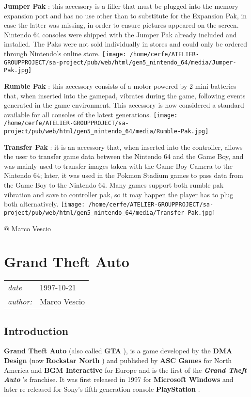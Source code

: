 \documentclass[a4paper,10pt]{book}
\newcommand{\pageHeader}[4]{
    \section{#1}
    \vspace{-0.3cm}
    \begin{table}[h!]
     \begin{tabular}{ll}
        \hline
        \textit{date} & #2 \\
        \textit{author: } & #3\\
        \hline
     \end{tabular}
    \end{table}
    \vspace{-0.3cm}
}
\begin{document}
 \textbf{Jumper Pak } : this accessory is a filler that must be plugged into the memory expansion port and has no use other than to substitute for the Expansion Pak, in case the latter was missing, in order to ensure pictures appeared on the screen. Nintendo 64 consoles were shipped with the Jumper Pak already included and installed. The Paks were not sold individually in stores and could only be ordered through Nintendo's online store. 
 \texttt{[image: /home/cerfe/ATELIER-GROUPPROJECT/sa-project/pub/web/html/gen5\_nintendo\_64/media/Jumper-Pak.jpg]}
 
 \textbf{Rumble Pak } : this accessory consists of a motor powered by 2 mini batteries that, when inserted into the gamepad, vibrates during the game, following events generated in the game environment. This accessory is now considered a standard available for all consoles of the latest generations. 
 \texttt{[image: /home/cerfe/ATELIER-GROUPPROJECT/sa-project/pub/web/html/gen5\_nintendo\_64/media/Rumble-Pak.jpg]}
 
 \textbf{Transfer Pak } : it is an accessory that, when inserted into the controller, allows the user to transfer game data between the Nintendo 64 and the Game Boy, and was mainly used to transfer images taken with the Game Boy Camera to the Nintendo 64; later, it was used in the Pokmon Stadium games to pass data from the Game Boy to the Nintendo 64. 
                Many games support both rumble pak vibration and save to controller pak, so it may happen the player has to plug both alternatively. 
 \texttt{[image: /home/cerfe/ATELIER-GROUPPROJECT/sa-project/pub/web/html/gen5\_nintendo\_64/media/Transfer-Pak.jpg]}
 
 
 
 
 @ Marco Vescio 
 
 \newpage\pageHeader{Grand Theft Auto}{1997-10-21}{Marco Vescio}{A webpage about GTA}
 \subsection{Introduction }
 
 \textbf{Grand Theft Auto }  (also called  \textbf{GTA } ), is a game developed by the  \textbf{DMA Design }  (now  \textbf{Rockstar North } ) and published by  \textbf{ASC Games }  for North America and  \textbf{BGM Interactive }  for Europe
        and is the first of the  \textbf{\textit{Grand Theft Auto }} 's franchise. It was first released in 1997 for  \textbf{Microsoft Windows }  and later re-released for Sony's fifth-generation console  \textbf{PlayStation } .
         
\end{document}
